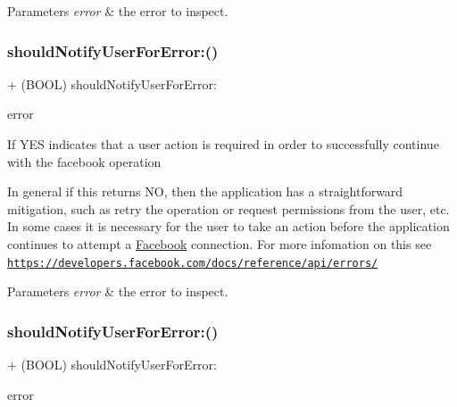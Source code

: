 \begin{DoxyParams}{Parameters}
{\em error} & the error to inspect. \\
\hline
\end{DoxyParams}
\mbox{\label{interfaceFBErrorUtility_a1417132074a898433aa3a79ab6ebc7b6}} 
\subsubsection{\texorpdfstring{should\+Notify\+User\+For\+Error\+:()}{shouldNotifyUserForError:()}\hspace{0.1cm}{\footnotesize\ttfamily [2/5]}}
{\footnotesize\ttfamily + (B\+O\+OL) should\+Notify\+User\+For\+Error\+: \begin{DoxyParamCaption}\item[{(N\+S\+Error $\ast$)}]{error }\end{DoxyParamCaption}}

If Y\+ES indicates that a user action is required in order to successfully continue with the facebook operation

In general if this returns NO, then the application has a straightforward mitigation, such as retry the operation or request permissions from the user, etc. In some cases it is necessary for the user to take an action before the application continues to attempt a \hyperlink{interfaceFacebook}{Facebook} connection. For more infomation on this see \href{https://developers.facebook.com/docs/reference/api/errors/}{\tt https\+://developers.\+facebook.\+com/docs/reference/api/errors/}


\begin{DoxyParams}{Parameters}
{\em error} & the error to inspect. \\
\hline
\end{DoxyParams}
\mbox{\label{interfaceFBErrorUtility_a1417132074a898433aa3a79ab6ebc7b6}} 
\subsubsection{\texorpdfstring{should\+Notify\+User\+For\+Error\+:()}{shouldNotifyUserForError:()}\hspace{0.1cm}{\footnotesize\ttfamily [3/5]}}
{\footnotesize\ttfamily + (B\+O\+OL) should\+Notify\+User\+For\+Error\+: \begin{DoxyParamCaption}\item[{(N\+S\+Error $\ast$)}]{error }\end{DoxyParamCaption}}

